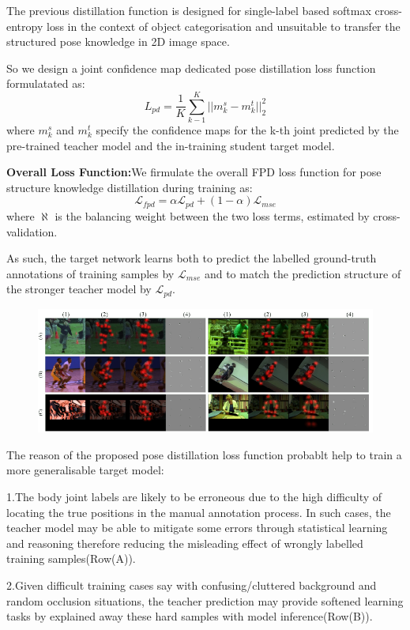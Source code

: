 \documentclass[11pt]{article}
\begin{document}
The previous distillation function is designed for single-label based softmax cross-entropy loss in the context of object categorisation and unsuitable to transfer the structured pose knowledge in 2D image space.

So we design a joint confidence map dedicated pose distillation loss function formulatated as:
$$L_{pd}=\frac{1}{K}\sum_{k-1}^{K}||m_k^s-m_k^t||^2_2$$
where $m_k^s$ and $m_k^t$ specify the confidence maps for the k-th joint predicted by the pre-trained teacher model and the in-training student target model.

\textbf{Overall Loss Function:}We firmulate the overall FPD loss function for pose structure knowledge distillation during training as:
$$\mathcal{L}_{fpd} = \alpha\mathcal{L}_{pd} + (1-\alpha)\mathcal{L}_{mse}$$
where $\aleph$ is the balancing weight between the two loss terms, estimated by cross-validation.

As such, the target network learns both to predict the labelled ground-truth annotations
of training samples by $\mathcal{L}_{mse}$ and to match the prediction structure of the stronger teacher model by $\mathcal{L}_{pd}$.

\begin{figure}[H]
	\centering
	\includegraphics[scale = 0.5]{73}
\end{figure}

The reason of the proposed pose distillation loss function probablt help to train a more generalisable target model:

1.The body joint labels are likely to be erroneous due to the high difficulty of locating the true positions in the manual annotation process. In such cases, the teacher model may be able to mitigate some errors through statistical learning and reasoning therefore reducing the misleading effect of wrongly labelled training samples(Row(A)).

2.Given difficult training cases say with confusing/cluttered background and random occlusion situations, the teacher prediction may provide softened learning tasks by explained away these hard samples with model inference(Row(B)).
\end{document}
